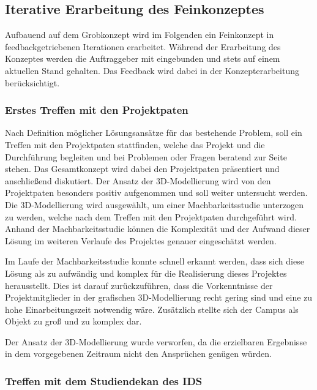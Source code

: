 \subsection{Iterative Erarbeitung des Feinkonzeptes}
\label{sec:ErarbeitungFeinkonzept}

Aufbauend auf dem Grobkonzept wird im Folgenden ein Feinkonzept in
feedbackgetriebenen Iterationen erarbeitet.
Während der Erarbeitung des Konzeptes werden die Auftraggeber mit eingebunden und stets auf einem aktuellen
Stand gehalten. Das Feedback wird dabei in der Konzepterarbeitung berücksichtigt.

\clearpage
\subsubsection*{Erstes Treffen mit den Projektpaten}
\label{sec:Treffen1}

Nach Definition möglicher Lösungsansätze für das bestehende Problem, soll ein Treffen 
mit den Projektpaten stattfinden, welche das Projekt und die Durchführung begleiten 
und bei Problemen oder Fragen beratend zur Seite stehen. Das Gesamtkonzept wird dabei 
den Projektpaten präsentiert und anschließend diskutiert. Der Ansatz der 3D-Modellierung wird von den 
Projektpaten besonders positiv aufgenommen und soll weiter untersucht werden. 
Die 3D-Modellierung wird ausgewählt, um einer Machbarkeitsstudie unterzogen zu werden, welche nach dem Treffen mit den 
Projektpaten durchgeführt wird. Anhand der Machbarkeitsstudie können die Komplexität und der Aufwand dieser Lösung im 
weiteren Verlaufe des Projektes genauer eingeschätzt werden.

Im Laufe der Machbarkeitsstudie konnte schnell erkannt werden, dass sich diese Lösung 
als zu aufwändig und komplex für die 
Realisierung dieses Projektes herausstellt. Dies ist darauf zurückzuführen, dass die Vorkenntnisse der Projektmitglieder 
in der grafischen 3D-Modellierung recht gering sind und eine zu hohe Einarbeitungszeit notwendig wäre. Zusätzlich stellte 
sich der Campus als Objekt zu groß und zu komplex dar. 

Der Ansatz der 3D-Modellierung wurde verworfen, da die erzielbaren Ergebnisse in dem vorgegebenen Zeitraum nicht den 
Ansprüchen genügen würden.


\subsubsection*{Treffen mit dem Studiendekan des IDS}
\label{sec:Treffen2}

